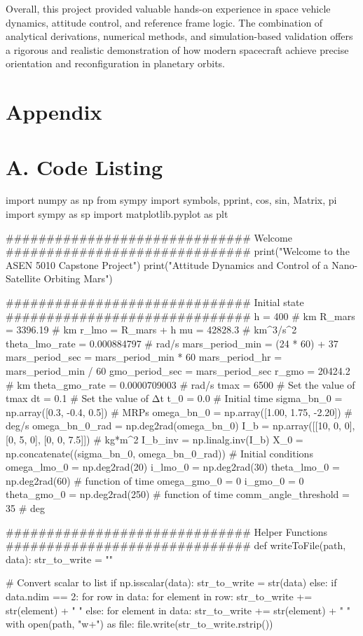 \documentclass[conf]{new-aiaa}
\begin{document}
Overall, this project provided valuable hands-on experience in space vehicle dynamics, attitude control, and reference frame logic. The combination of analytical derivations, numerical methods, and simulation-based validation offers a rigorous and realistic demonstration of how modern spacecraft achieve precise orientation and reconfiguration in planetary orbits.

\section*{Appendix}
\section*{A. Code Listing}
\begin{pythoncode}
import numpy as np
from sympy import symbols, pprint, cos, sin, Matrix, pi
import sympy as sp
import matplotlib.pyplot as plt

############################## Welcome ##############################
print("Welcome to the ASEN 5010 Capstone Project")
print("Attitude Dynamics and Control of a Nano-Satellite Orbiting Mars")

############################## Initial state ##############################
h = 400  # km
R_mars = 3396.19  # km
r_lmo = R_mars + h
mu = 42828.3  # km^3/s^2
theta_lmo_rate = 0.000884797  # rad/s
mars_period_min = (24 * 60) + 37
mars_period_sec = mars_period_min * 60
mars_period_hr = mars_period_min / 60
gmo_period_sec = mars_period_sec
r_gmo = 20424.2  # km
theta_gmo_rate = 0.0000709003  # rad/s
tmax = 6500  # Set the value of tmax
dt = 0.1  # Set the value of Δt
t_0 = 0.0  # Initial time
sigma_bn_0 = np.array([0.3, -0.4, 0.5])  # MRPs
omega_bn_0 = np.array([1.00, 1.75, -2.20])  # deg/s
omega_bn_0_rad = np.deg2rad(omega_bn_0)
I_b = np.array([[10, 0, 0], [0, 5, 0], [0, 0, 7.5]])  # kg*m^2
I_b_inv = np.linalg.inv(I_b)
X_0 = np.concatenate((sigma_bn_0, omega_bn_0_rad))  # Initial conditions
omega_lmo_0 = np.deg2rad(20)
i_lmo_0 = np.deg2rad(30)
theta_lmo_0 = np.deg2rad(60)  # function of time
omega_gmo_0 = 0
i_gmo_0 = 0
theta_gmo_0 = np.deg2rad(250)  # function of time
comm_angle_threshold = 35  # deg


############################## Helper Functions ##############################
def writeToFile(path, data):
    str_to_write = ""

    # Convert scalar to list
    if np.isscalar(data):
        str_to_write = str(data)
    else:
        if data.ndim == 2:
            for row in data:
                for element in row:
                    str_to_write += str(element) + " "
        else:
            for element in data:
                str_to_write += str(element) + " "
    with open(path, "w+") as file:
        file.write(str_to_write.rstrip())



\end{pythoncode}
\end{document}
